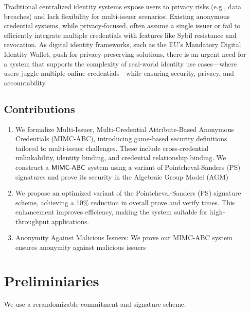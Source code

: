 Traditional centralized identity systems expose users to privacy risks (e.g., data breaches) and lack flexibility for multi-issuer scenarios. Existing anonymous credential systems, while privacy-focused, often assume a single issuer or fail to efficiently integrate multiple credentials with features like Sybil resistance and revocation. As digital identity frameworks, such as the EU’s Mandatory Digital Identity Wallet, push for privacy-preserving solutions, there is an urgent need for a system that supports the complexity of real-world identity use cases—where users juggle multiple online credentials—while ensuring security, privacy, and accountability


\subsection{Contributions}

\begin{enumerate}
    \item We formalize Multi-Issuer, Multi-Credential Attribute-Based Anonymous Credentials (MIMC-ABC), introducing game-based security definitions tailored to multi-issuer challenges. These include cross-credential unlinkability, identity binding, and credential relationship binding. We construct a $\mathsf{MIMC\text{-}ABC}$ system using a variant of Pointcheval-Sanders (PS) signatures and prove its security in the Algebraic Group Model (AGM)

    \item We propose an optimized variant of the Pointcheval-Sanders (PS) signature scheme, achieving a 10\% reduction in overall prove and verify times. This enhancement improves efficiency, making the system suitable for high-throughput applications.

    \item  Anonymity Against Malicious Issuers: We prove our MIMC-ABC system ensures anonymity against malicious issuers
\end{enumerate}







\section{Preliminiaries}
We use a rerandomizable commitment and signature scheme. 

